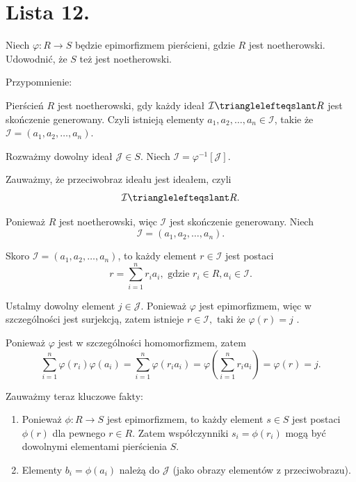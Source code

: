 \chapter{Lista 12.}

\begin{problem}[1]
	Niech $\varphi : R \to S $ będzie epimorfizmem pierścieni, gdzie $R$ jest noetherowski. Udowodnić, że $S$ też jest noetherowski.
\end{problem} 
\begin{solution}
	Przypomnienie:

	\begin{note}
	
		Pierścień $R$ jest noetherowski, gdy każdy ideał $\mathcal{I} \trianglelefteqslant R$ jest skończenie generowany. Czyli istnieją elementy $a_1,a_2,\ldots,a_{n} \in \mathcal{I}$, takie że $\mathcal{I} = \left( a_1,a_2,\ldots,a_{n}  \right) $.
	\end{note}

	Rozważmy dowolny ideał $\mathcal{J} \in S$. Niech $\mathcal{I} = \varphi ^{-1}\left[ \mathcal{J} \right]$. 

	Zauważmy, że przeciwobraz ideału jest ideałem, czyli
	\[
	\mathcal{I} \trianglelefteqslant R
	.\] 

	Ponieważ $R$ jest noetherowski, więc $\mathcal{I}$ jest skończenie generowany. Niech
	\[
	\mathcal{I} = \left( a_1,a_2,\ldots,a_{n}  \right) 
	.\] 

	Skoro $\mathcal{I} = \left( a_1,a_2,\ldots,a_{n}  \right) $, to każdy element $r \in \mathcal{I}$ jest postaci 
	\[
	r = \sum_{i=1}^{n} r_{i}a_{i}, \text{ gdzie } r_{i} \in R, a_{i} \in \mathcal{I}
	.\] 

	Ustalmy dowolny element  $j \in \mathcal{J}$. Ponieważ $\varphi$ jest epimorfizmem, więc w szczególności jest surjekcją, zatem istnieje  $r \in \mathcal{I}, \text{ taki że } \varphi \left( r \right) = j$ .

	Ponieważ $\varphi  $ jest w szczególności homomorfizmem, zatem
	\[
	\sum_{i=1}^{n} \varphi \left( r_{i} \right) \varphi \left( a_{i} \right) = \sum_{i=1}^{n} \varphi \left( r_{i}a_{i} \right) = \varphi \left( \sum_{i=1}^{n} r_{i}a_{i} \right) = \varphi \left( r \right) = j     
	.\] 
	 
	Zauważmy teraz kluczowe fakty:
    \begin{enumerate}
        \item Ponieważ $\phi: R \to S$ jest epimorfizmem, to każdy element $s \in S$ jest postaci $\phi(r)$ dla pewnego $r \in R$. Zatem współczynniki $s_i = \phi(r_i)$ mogą być dowolnymi elementami pierścienia $S$.
        \item Elementy $b_i = \phi(a_i)$ należą do $\mathcal{J}$ (jako obrazy elementów z przeciwobrazu).
    \end{enumerate}


\end{solution}
